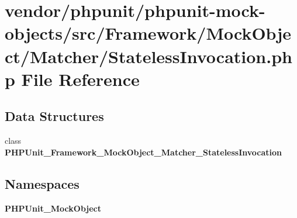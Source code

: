 \section{vendor/phpunit/phpunit-\/mock-\/objects/src/\+Framework/\+Mock\+Object/\+Matcher/\+Stateless\+Invocation.php File Reference}
\label{_stateless_invocation_8php}
\subsection*{Data Structures}
\begin{DoxyCompactItemize}
\item 
class {\bf P\+H\+P\+Unit\+\_\+\+Framework\+\_\+\+Mock\+Object\+\_\+\+Matcher\+\_\+\+Stateless\+Invocation}
\end{DoxyCompactItemize}
\subsection*{Namespaces}
\begin{DoxyCompactItemize}
\item 
 {\bf P\+H\+P\+Unit\+\_\+\+Mock\+Object}
\end{DoxyCompactItemize}
